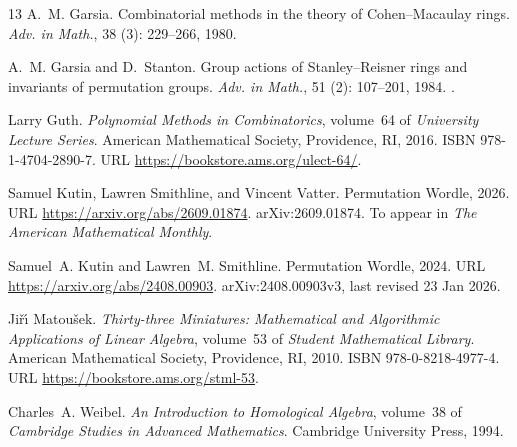 \documentclass[12pt]{amsart}
\theoremstyle{definition}
\theoremstyle{remark}
\begin{document}
\begin{thebibliography}{13}
A.~M. Garsia.
\newblock Combinatorial methods in the theory of {C}ohen--{M}acaulay rings.
\newblock \emph{Adv. in Math.}, 38 (3): 229--266, 1980.

A.~M. Garsia and D.~Stanton.
\newblock Group actions of {S}tanley--{R}eisner rings and invariants of
  permutation groups.
\newblock \emph{Adv. in Math.}, 51 (2): 107--201, 1984.
\newblock {}.

Larry Guth.
\newblock \emph{Polynomial Methods in Combinatorics}, volume~64 of
  \emph{University Lecture Series}.
\newblock American Mathematical Society, Providence, RI, 2016.
\newblock ISBN 978-1-4704-2890-7.
\newblock URL \url{https://bookstore.ams.org/ulect-64/}.

Samuel Kutin, Lawren Smithline, and Vincent Vatter.
\newblock Permutation {Wordle}, 2026.
\newblock URL \url{https://arxiv.org/abs/2609.01874}.
\newblock arXiv:2609.01874. To appear in \emph{The American Mathematical
  Monthly}.

Samuel~A. Kutin and Lawren~M. Smithline.
\newblock Permutation {Wordle}, 2024.
\newblock URL \url{https://arxiv.org/abs/2408.00903}.
\newblock arXiv:2408.00903v3, last revised 23 Jan 2026.

Ji{\v{r}}{\'\i} Matou{\v{s}}ek.
\newblock \emph{Thirty-three Miniatures: Mathematical and Algorithmic
  Applications of Linear Algebra}, volume~53 of \emph{Student Mathematical
  Library}.
\newblock American Mathematical Society, Providence, RI, 2010.
\newblock ISBN 978-0-8218-4977-4.
\newblock URL \url{https://bookstore.ams.org/stml-53}.

Charles~A. Weibel.
\newblock \emph{An Introduction to Homological Algebra}, volume~38 of
  \emph{Cambridge Studies in Advanced Mathematics}.
\newblock Cambridge University Press, 1994.

\end{thebibliography}
\end{document}
